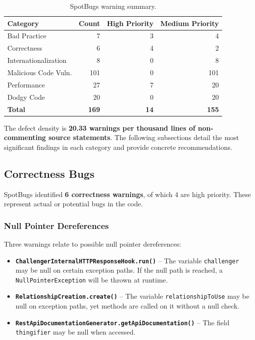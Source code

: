 \documentclass[11pt,a4paper]{article}
\begin{document}
\begin{table}[H]
    \centering
    \caption{SpotBugs warning summary.}
    \label{tab:spotbugs-summary}
    \begin{tabular}{lrrr}
        \toprule
        \textbf{Category} & \textbf{Count} & \textbf{High Priority} & \textbf{Medium Priority} \\
        \midrule
        Bad Practice            & 7   & 3 & 4  \\
        Correctness             & 6   & 4 & 2  \\
        Internationalization    & 8   & 0 & 8  \\
        Malicious Code Vuln.    & 101 & 0 & 101 \\
        Performance             & 27  & 7 & 20 \\
        Dodgy Code              & 20  & 0 & 20 \\
        \midrule
        \textbf{Total}          & \textbf{169} & \textbf{14} & \textbf{155} \\
        \bottomrule
    \end{tabular}
\end{table}

\noindent The defect density is \textbf{20.33 warnings per thousand lines of non-commenting source statements}. The following subsections detail the most significant findings in each category and provide concrete recommendations.

\subsection{Correctness Bugs}

SpotBugs identified \textbf{6 correctness warnings}, of which 4 are high priority. These represent actual or potential bugs in the code.

\subsubsection{Null Pointer Dereferences}

Three warnings relate to possible null pointer dereferences:

\begin{itemize}
    \item \textbf{\texttt{ChallengerInternalHTTPResponseHook.run()}} -- The variable \texttt{challenger} may be null on certain exception paths. If the null path is reached, a \texttt{NullPointerException} will be thrown at runtime.
    \item \textbf{\texttt{RelationshipCreation.create()}} -- The variable \texttt{relationshipToUse} may be null on exception paths, yet methods are called on it without a null check.
    \item \textbf{\texttt{RestApiDocumentationGenerator.getApiDocumentation()}} -- The field \texttt{thingifier} may be null when accessed.
\end{itemize}
\end{document}
